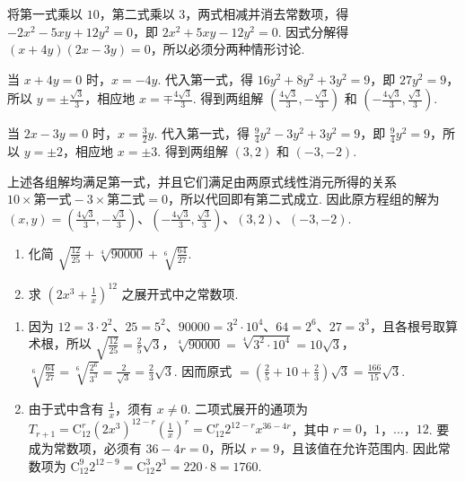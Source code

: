 \documentclass[UTF8,a4paper,oneside,11pt]{ctexbook}
\begin{document}
\begin{solution}
将第一式乘以 \(10\)，第二式乘以 \(3\)，两式相减并消去常数项，得 \(-2x^2-5xy+12y^2=0\)，即 \(2x^2+5xy-12y^2=0\). 因式分解得 \(\left(x+4y\right)\left(2x-3y\right)=0\)，所以必须分两种情形讨论.

当 \(x+4y=0\) 时，\(x=-4y\). 代入第一式，得 \(16y^2+8y^2+3y^2=9\)，即 \(27y^2=9\)，所以 \(y=\pm\frac{\sqrt3}{3}\)，相应地 \(x=\mp\frac{4\sqrt3}{3}\). 得到两组解 \(\left(\frac{4\sqrt3}{3},-\frac{\sqrt3}{3}\right)\) 和 \(\left(-\frac{4\sqrt3}{3},\frac{\sqrt3}{3}\right)\).

当 \(2x-3y=0\) 时，\(x=\frac32y\). 代入第一式，得 \(\frac94y^2-3y^2+3y^2=9\)，即 \(\frac94y^2=9\)，所以 \(y=\pm2\)，相应地 \(x=\pm3\). 得到两组解 \(\left(3,2\right)\) 和 \(\left(-3,-2\right)\).

上述各组解均满足第一式，并且它们满足由两原式线性消元所得的关系 \(10\times\text{第一式}-3\times\text{第二式}=0\)，所以代回即有第二式成立. 因此原方程组的解为 \(\left(x,y\right)=\left(\frac{4\sqrt3}{3},-\frac{\sqrt3}{3}\right)\)、\(\left(-\frac{4\sqrt3}{3},\frac{\sqrt3}{3}\right)\)、\(\left(3,2\right)\)、\(\left(-3,-2\right)\).
\end{solution}

\begin{problem}
\begin{enumerate}
    \item 化简 \(\sqrt{\frac{12}{25}} + \sqrt[4]{90000} + \sqrt[6]{\frac{64}{27}}\).
    \item 求 \(\left( 2x^{3} + \frac{1}{x} \right)^{12}\) 之展开式中之常数项.
\end{enumerate}
\end{problem}

\begin{solution}
\begin{enumerate}
\item
因为 \(12=3\cdot2^2\)、\(25=5^2\)、\(90000=3^2\cdot10^4\)、\(64=2^6\)、\(27=3^3\)，且各根号取算术根，所以
\(\sqrt{\frac{12}{25}}=\frac25\sqrt3\)，\(\sqrt[4]{90000}=\sqrt[4]{3^2\cdot10^4}=10\sqrt3\)，\(\sqrt[6]{\frac{64}{27}}=\sqrt[6]{\frac{2^6}{3^3}}=\frac{2}{\sqrt3}=\frac23\sqrt3\). 因而原式 \(=\left(\frac25+10+\frac23\right)\sqrt3=\frac{166}{15}\sqrt3\).

\item 由于式中含有 \(\frac1x\)，须有 \(x\ne0\). 二项式展开的通项为 \(T_{r+1}=\mathrm C_{12}^{r}\left(2x^3\right)^{12-r}\left(\frac1x\right)^r=\mathrm C_{12}^{r}2^{12-r}x^{36-4r}\)，其中 \(r=0\)，\(1\)，\(\ldots\)，\(12\). 要成为常数项，必须有 \(36-4r=0\)，所以 \(r=9\)，且该值在允许范围内. 因此常数项为 \(\mathrm C_{12}^{9}2^{12-9}=\mathrm C_{12}^{3}2^3=220\cdot8=1760\).
\end{enumerate}
\end{solution}
\end{document}
